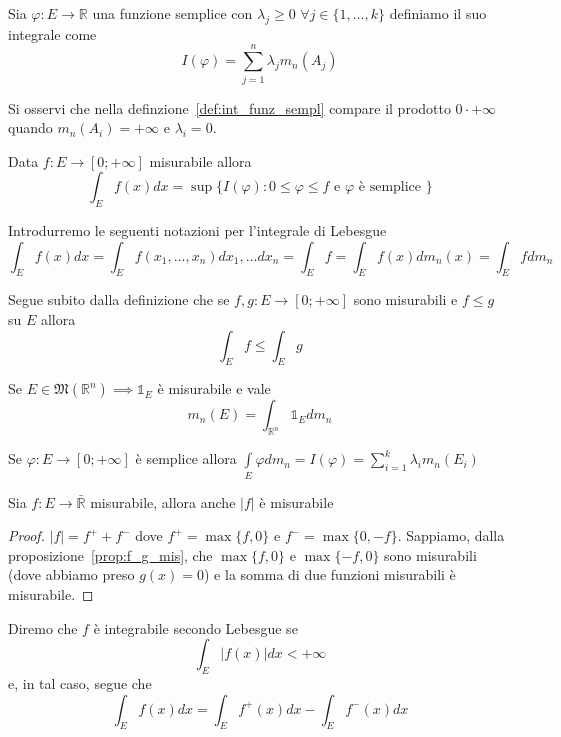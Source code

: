 \begin{definition}
	Sia $\varphi: E \to \mathbb{R}$ una funzione semplice con $\lambda_j \geq 0 \, \, \forall j \in \{1, \ldots, k \}$ definiamo il suo integrale come
	\begin{equation}
		I(\varphi) = \sum_{j=1}^n \lambda_j m_n(A_j)
		\label{def:int_funz_sempl}
	\end{equation}
\end{definition}
\begin{remark}
Si osservi che nella definzione~\ref{def:int_funz_sempl} compare il prodotto $0 \cdot +\infty$ quando $m_n(A_i) = +\infty$ e $\lambda_i = 0$.
\end{remark}
\begin{definition}
	Data $f: E \to [0; +\infty]$ misurabile allora
	$$
		\int_E f(x)dx = \sup\{I(\varphi) : 0 \leq \varphi \leq f \text{ e } \varphi \text{ è semplice } \}
	$$
\end{definition}
Introdurremo le seguenti notazioni per l'integrale di Lebesgue
$$
\int_E f(x)dx = \int_E f(x_1, \ldots, x_n)dx_1, \ldots dx_n = \int_E f = \int_E f(x)dm_n(x) = \int_E fdm_n 
$$
\begin{remark}
Segue subito dalla definizione che se $f, g: E \to [0; +\infty]$ sono misurabili e $f \leq g$ su $E$ allora
$$
\int_E f \leq \int_E g
$$
\end{remark}
\begin{remark}
Se $E \in \mathfrak{M}(\mathbb{R}^n) \implies \mathbb{1}_E$ è misurabile e vale
$$
m_n(E) = \int_{\mathbb{R}^n} \mathbb{1}_E dm_n
$$
\end{remark}
\begin{remark}
Se $\varphi: E \to [0; +\infty]$ è semplice allora $\int\limits_E \varphi dm_n = I(\varphi) = \sum_{i=1}^k \lambda_i m_n(E_i) $
\end{remark}
\begin{prop}
Sia $f: E \to \bar{\mathbb{R}}$ misurabile, allora anche $|f|$ è misurabile
\end{prop}
\begin{proof}
$|f| = f^+ + f^-$ dove $f^{+} = \max\{f, 0 \}$ e $f^{-}=\max\{0, -f \}$. Sappiamo, dalla proposizione~\ref{prop:f_g_mis}, che $\max\{f,0 \}$ e $\max\{-f, 0\}$ sono misurabili (dove abbiamo preso $g(x) = 0$) e la somma di due funzioni misurabili è misurabile.
\end{proof}
\begin{definition}
	Diremo che $f$ è integrabile secondo Lebesgue se
	$$
	\int_E |f(x)|dx < +\infty
	$$
	e, in tal caso, segue che
	$$
	\int_E f(x)dx = \int_E f^{+}(x)dx - \int_E f^{-}(x)dx
	$$
\end{definition}
